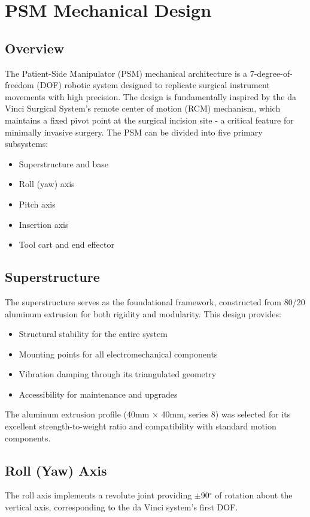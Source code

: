 \section{PSM Mechanical Design}

\subsection{Overview}
The Patient-Side Manipulator (PSM) mechanical architecture is a 7-degree-of-freedom (DOF) robotic system designed to replicate surgical instrument movements with high precision. The design is fundamentally inspired by the da Vinci Surgical System's remote center of motion (RCM) mechanism, which maintains a fixed pivot point at the surgical incision site - a critical feature for minimally invasive surgery. The PSM can be divided into five primary subsystems:

\begin{itemize}
    \item Superstructure and base
    \item Roll (yaw) axis
    \item Pitch axis
    \item Insertion axis
    \item Tool cart and end effector
\end{itemize}

\subsection{Superstructure}
The superstructure serves as the foundational framework, constructed from 80/20 aluminum extrusion for both rigidity and modularity. This design provides:
\begin{itemize}
    \item Structural stability for the entire system
    \item Mounting points for all electromechanical components
    \item Vibration damping through its triangulated geometry
    \item Accessibility for maintenance and upgrades
\end{itemize}

The aluminum extrusion profile (40mm × 40mm, series 8) was selected for its excellent strength-to-weight ratio and compatibility with standard motion components.

\subsection{Roll (Yaw) Axis}
The roll axis implements a revolute joint providing $\pm$90$^\circ$ of rotation about the vertical axis, corresponding to the da Vinci system's first DOF.

